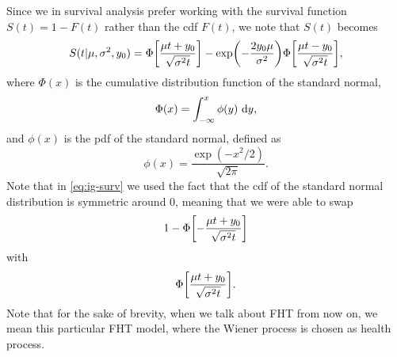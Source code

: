 Since we in survival analysis prefer working with the survival function $S(t)=1-F(t)$ rather than the cdf $F(t)$, we note that $S(t)$ becomes
\begin{equation}
\label{eq:ig-surv}
    S(t|\mu,\sigma^2,y_0)=\Phi\sqb*{\frac{\mu t+y_0}{\sqrt{\sigma^2t}}}-\exp\p*{-\frac{2y_0\mu}{\sigma^2}}\Phi\sqb*{\frac{\mu t-y_0}{\sqrt{\sigma^2t}}},
\end{equation}
where $\Phi(x)$ is the cumulative distribution function of the standard normal,
\begin{equation*}
    \Phi(x)=\int_{-\infty}^x\phi(y)\text{~d}y,
\end{equation*}
and $\phi(x)$ is the pdf of the standard normal, defined as
\begin{equation*}
    \phi(x)=\frac{\exp\left(-x^2/2\right)}{\sqrt{2\pi}}.
\end{equation*}
Note that in \eqref{eq:ig-surv} we used the fact that the cdf of the standard normal distribution is symmetric around 0,
meaning that we were able to swap
\begin{equation*}
    1-\Phi\sqb*{-\frac{\mu t+y_0}{\sqrt{\sigma^2t}}}
\end{equation*}
with
\begin{equation*}
    \Phi\sqb*{\frac{\mu t+y_0}{\sqrt{\sigma^2t}}}.
\end{equation*}
Note that for the sake of brevity, when we talk about FHT from now on, we mean this particular FHT model, where the Wiener process is chosen as health process.

